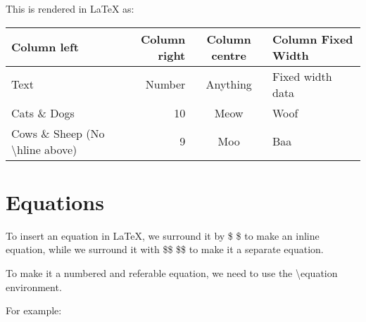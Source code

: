\documentclass[12pt,a4paper]{article}
\begin{document}
This is rendered in \LaTeX{} as:

\begin{tabular}{|l r|c|p{2cm}|}
\hline
Column left & Column right & Column centre & Column Fixed Width \\
\hline
Text & Number & Anything & Fixed width data \\
\hline
Cats \& Dogs & 10 & Meow & Woof \\
Cows \& Sheep (No \textbackslash hline above) & 9 & Moo & Baa \\
\hline
\end{tabular}

\section{Equations}

To insert an equation in \LaTeX{}, we surround it by \$ \$ to make an inline equation, while we surround it with \$\$ \$\$ to make it a separate equation.

To make it a numbered and referable equation, we need to use the \textbackslash equation environment.

For example:

\fbox{
\begin{minipage}{35em}

\end{minipage}
}
\end{document}
